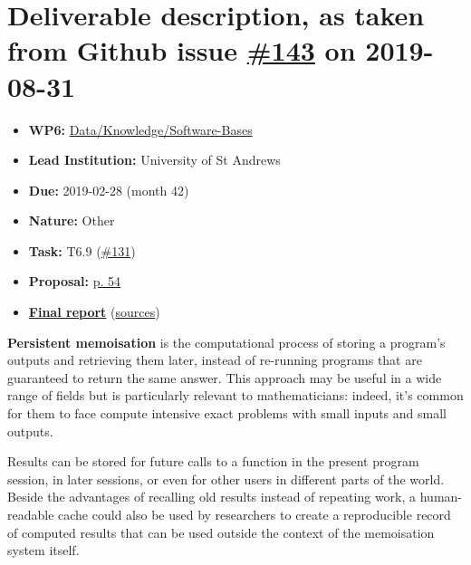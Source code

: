 \hypertarget{deliverable-description-as-taken-from-github-issue-143-on-2019-08-31}{%
\section*{\texorpdfstring{Deliverable description, as taken from Github
issue
\href{https://github.com/OpenDreamKit/OpenDreamKit/issues/143}{\#143} on
2019-08-31}{Deliverable description, as taken from Github issue \#143 on 2019-08-31}}\label{deliverable-description-as-taken-from-github-issue-143-on-2019-08-31}}

\begin{itemize}
\tightlist
\item
  \textbf{WP6:}
  \href{https://github.com/OpenDreamKit/OpenDreamKit/tree/master/WP6}{Data/Knowledge/Software-Bases}
\item
  \textbf{Lead Institution:} University of St Andrews
\item
  \textbf{Due:} 2019-02-28 (month 42)
\item
  \textbf{Nature:} Other
\item
  \textbf{Task:} T6.9
  (\href{https://github.com/OpenDreamKit/OpenDreamKit/issues/131}{\#131})
\item
  \textbf{Proposal:}
  \href{https://github.com/OpenDreamKit/OpenDreamKit/raw/master/Proposal/proposal-www.pdf}{p.
  54}
\item
  \textbf{\href{https://github.com/OpenDreamKit/OpenDreamKit/raw/master/WP6/D6.9/report-final.pdf}{Final
  report}}
  (\href{https://github.com/OpenDreamKit/OpenDreamKit/raw/master/WP6/D6.9/}{sources})
\end{itemize}

\textbf{Persistent memoisation} is the computational process of storing
a program's outputs and retrieving them later, instead of re-running
programs that are guaranteed to return the same answer. This approach
may be useful in a wide range of fields but is particularly relevant to
mathematicians: indeed, it's common for them to face compute intensive
exact problems with small inputs and small outputs.

Results can be stored for future calls to a function in the present
program session, in later sessions, or even for other users in different
parts of the world. Beside the advantages of recalling old results
instead of repeating work, a human-readable cache could also be used by
researchers to create a reproducible record of computed results that can
be used outside the context of the memoisation system itself.

